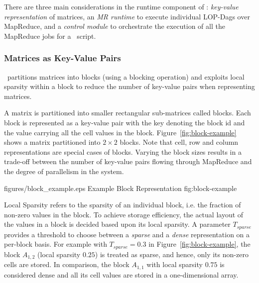 There are three main considerations in the runtime component of \systemmltext: 
\textit{key-value representation} of matrices, an \textit{MR runtime} to execute 
individual LOP-Dags over MapReduce, and a \textit{control module} to orchestrate the 
execution of all the MapReduce jobs for a \dmlr\ script. 

\subsubsection{Matrices as Key-Value Pairs}
\label{sec:blocking}

\systemmltext\ partitions matrices into blocks (using a blocking operation) and exploits local sparsity within a block to reduce 
the number of key-value pairs when representing matrices. 

 A matrix is partitioned into smaller rectangular sub-matrices called blocks. Each block is represented as a key-value pair with the key denoting the block id and the value carrying all the cell values in the block. Figure~\ref{fig:block-example} shows a matrix partitioned into $2 \times 2$ blocks. Note that cell, row and column representations are special cases of blocks. Varying the block sizes results in a trade-off between the number of key-value pairs flowing through MapReduce and the degree of parallelism in the system.



\onefigure
{figures/block_example.eps} 
{Example Block Representation}
{fig:block-example}


 Local Sparsity refers to the sparsity of an individual 
block, i.e. the fraction of non-zero values in the block. To achieve storage efficiency, 
the actual layout of the values in a block is decided based upon its local sparsity. A 
parameter $T_{sparse}$ provides a threshold to choose between a \textit{sparse} and a 
\textit{dense} representation on a per-block basis. For example with $T_{sparse} = 0.3$ in 
Figure~\ref{fig:block-example}, the block $A_{1,2}$ (local sparsity $0.25$) is treated as 
sparse, and hence, only its non-zero cells are stored. In comparison, the block $A_{1,1}$ 
with local sparsity $0.75$ is considered dense and all its cell values are stored in a 
one-dimensional array.

